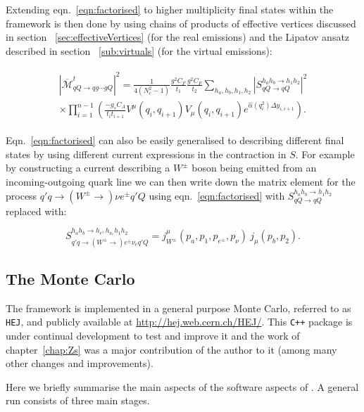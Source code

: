 		Extending eqn.~\eqref{eqn:factorised} to higher multiplicity final states within the \hej
		framework is then done by using chains of products of effective vertices discussed in section
		~\eqref{sec:effectiveVertices} (for the real emissions) and the Lipatov ansatz described in section
		~\eqref{sub:virtuals} (for the virtual emissions):

		\begin{align}
		\begin{split}
			|\overline{\mathcal{M}}^t_{qQ\rightarrow qg\cdots gQ}|^2 = \frac{1}{4(N_c^2-1)}
			\frac{g^2C_F}{t_1}\frac{g^2C_F}{t_2} \sum_{h_a, h_b, h_1, h_2}
			|S_{qQ\rightarrow qQ}^{h_ah_b\rightarrow h_1h_2}|^2\\
			\times\prod_{i=1}^{n-1}\left(\frac{-g_sC_A}{t_it_{i+1}}V^\mu(q_i, q_{i+1})V_\mu(q_i, q_{i+1})e^{\hat{\alpha}(q_i^2)\Delta y_{i, i+1}}\right).
			\label{eqn:factorised2ToNwithExp}
		\end{split}
		\end{align}

		Eqn.~\eqref{eqn:factorised} can also be easily generalised to describing different final states by using
		different current expressions in the contraction in $S$.  For example by constructing a current
		describing a $W^\pm$ boson being emitted from an incoming-outgoing quark line we can then write down
		the matrix element for the process $q'q\to(W^\pm\to)\nu e^\pm q'Q$ using eqn.~\eqref{eqn:factorised}
		with $S_{qQ\rightarrow qQ}^{h_ah_b\rightarrow h_1h_2}$ replaced with:

		\begin{equation}
			S_{q'q\to(W^\pm\to)e^\pm\nu_eq'Q}^{h_ah_b\to h_{e^\pm}h_{\nu_e}h_1h_2} =
			{j^\mu_{W^\pm}(p_a, p_1, p_{e^\pm}, p_\nu)\ j_\mu(p_b, p_2)}.
			\label{eqn:wExample}
		\end{equation}

	\subsection{The \hej Monte Carlo}

		The \hej framework is implemented in a general purpose Monte Carlo, referred to as
		\texttt{HEJ}, and publicly available at \url{http://hej.web.cern.ch/HEJ/}.  This
		\texttt{C++} package is under continual development to test and improve it and the work
		of chapter~\ref{chap:Zs} was a major contribution of the author to it (among many other
		changes and improvements).

		Here we briefly summarise the main aspects of the software aspects of \hej.  A general
		\HEJ run consists of three main stages.

